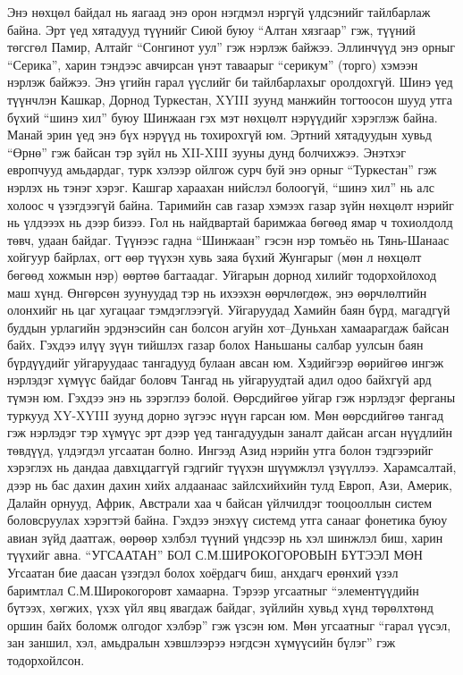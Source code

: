 Энэ нөхцөл байдал нь яагаад энэ орон нэгдмэл нэргүй үлдсэнийг тайлбарлаж байна. Эрт үед хятадууд түүнийг Сиюй буюу “Алтан хязгаар” гэж, түүний төгсгөл Памир, Алтайг “Сонгинот уул” гэж нэрлэж байжээ. Эллинчүүд энэ орныг “Серика”, харин тэндээс авчирсан үнэт таваарыг “серикум” (торго) хэмээн нэрлэж байжээ. Энэ үгийн гарал үүслийг би тайлбарлахыг оролдохгүй.
Шинэ үед түүнчлэн Кашкар, Дорнод Туркестан, XYIII зуунд манжийн тогтоосон шууд утга бүхий “шинэ хил” буюу Шинжаан гэх мэт нөхцөлт нэрүүдийг хэрэглэж байна. Манай эрин үед энэ бүх нэрүүд нь тохирохгүй юм. Эртний хятадуудын хувьд “Өрнө” гэж байсан тэр зүйл нь XII-XIII зууны дунд болчихжээ. Энэтхэг европчууд амьдардаг, турк хэлээр ойлгож сурч буй энэ орныг “Туркестан” гэж нэрлэх нь тэнэг хэрэг. Кашгар хараахан нийслэл болоогүй, “шинэ хил” нь алс холоос ч үзэгдээгүй байна. Таримийн сав газар хэмээх газар зүйн нөхцөлт нэрийг нь үлдэээх нь дээр бизээ. Гол нь найдвартай баримжаа бөгөөд ямар ч тохиолдолд төвч, удаан байдаг. Түүнээс гадна “Шинжаан” гэсэн нэр томъёо нь Тянь-Шанаас хойгуур байрлах, огт өөр түүхэн хувь заяа бүхий Жунгарыг (мөн л нөхцөлт бөгөөд хожмын нэр) өөртөө багтаадаг.
Уйгарын дорнод хилийг тодорхойлоход маш хүнд. Өнгөрсөн зуунуудад тэр нь ихээхэн өөрчлөгдөж, энэ өөрчлөлтийн олонхийг нь цаг хугацааг тэмдэглээгүй. Уйгаруудад Хамийн баян бүрд, магадгүй буддын урлагийн эрдэнэсийн сан болсон агуйн хот–Дуньхан хамаарагдаж байсан байх. Гэхдээ илүү зүүн тийшлэх газар болох Наньшаны салбар уулсын баян бүрдүүдийг уйгаруудаас тангадууд булаан авсан юм. Хэдийгээр өөрийгөө ингэж нэрлэдэг хүмүүс байдаг боловч Тангад нь уйгаруудтай адил одоо байхгүй ард түмэн юм. Гэхдээ энэ нь зэрэглээ болой. Өөрсдийгөө уйгар гэж нэрлэдэг ферганы туркууд XY-XYIII зуунд дорно зүгээс нүүн гарсан юм. Мөн өөрсдийгөө тангад гэж нэрлэдэг тэр хүмүүс эрт дээр үед тангадуудын заналт дайсан агсан нүүдлийн төвдүүд, үлдэгдэл угсаатан болно.
Ингээд Азид нэрийн утга болон тэдгээрийг хэрэглэх нь дандаа давхцдаггүй гэдгийг түүхэн шүүмжлэл үзүүллээ. Харамсалтай, дээр нь бас дахин дахин хийх алдаанаас зайлсхийхийн тулд Европ, Ази, Америк, Далайн орнууд, Африк, Австрали хаа ч байсан үйлчилдэг тооцооллын систем боловсруулах хэрэгтэй байна. Гэхдээ энэхүү системд утга санааг фонетика буюу авиан зүйд даатгаж, өөрөөр хэлбэл түүний үндсээр нь хэл шинжлэл биш, харин түүхийг авна.
“УГСААТАН” БОЛ С.М.ШИРОКОГОРОВЫН БҮТЭЭЛ МӨН
Угсаатан бие даасан үзэгдэл болох хоёрдагч биш, анхдагч ерөнхий үзэл баримтлал С.М.Широкогоровт хамаарна. Тэрээр угсаатныг “элементүүдийн бүтээх, хөгжих, үхэх үйл явц явагдаж байдаг, зүйлийн хувьд хүнд төрөлхтөнд оршин байх боломж олгодог хэлбэр” гэж үзсэн юм. Мөн угсаатныг “гарал үүсэл, зан заншил, хэл, амьдралын хэвшлээрээ нэгдсэн хүмүүсийн бүлэг” гэж тодорхойлсон.
